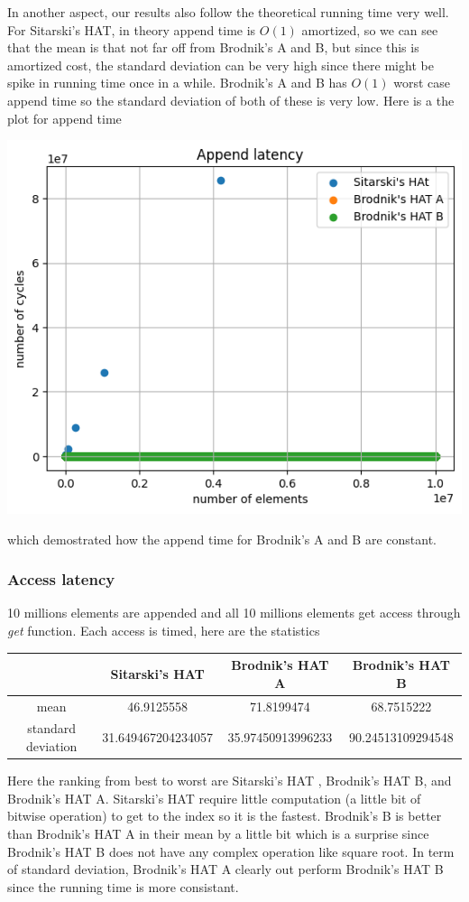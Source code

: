 \documentclass{article} %
\begin{document}
    In another aspect, our results also follow the theoretical running time very well. For Sitarski's HAT, in theory append time is $O(1)$ amortized, so we can see that the mean
    is that not far off from Brodnik's A and B, but since this is amortized cost, the standard deviation can be very high since there might be spike in running time once in a while. Brodnik's A and B has $O(1)$ worst case append time so
    the standard deviation of both of these is very low. Here is a the plot for append time
    \begin{center}
        \includegraphics{graphics/hat_append.png}
    \end{center}
    which demostrated how the append time for Brodnik's A and B are constant.
    \subsubsection*{Access latency}
    10 millions elements are appended and all 10 millions elements get access through \emph{get} function.
    Each access is timed, here are the statistics
    \begin{center}
        \begin{tabular}{|c|c|c|c|}\hline
            & Sitarski's HAT & Brodnik's HAT A & Brodnik's HAT B\\\hline
            mean &  46.9125558 & 71.8199474 & 68.7515222\\\hline
            standard deviation & 31.649467204234057  & 35.97450913996233 & 90.24513109294548\\\hline 
        \end{tabular}
    \end{center}
    Here the ranking from best to worst are Sitarski's HAT , Brodnik's HAT B, and Brodnik's HAT A. Sitarski's HAT require little
    computation (a little bit of bitwise operation) to get to the index so it is the fastest. Brodnik's B is better than Brodnik's HAT A in
    their mean by a little bit which is a surprise since Brodnik's HAT B does not have any complex operation like square root. In term of standard deviation,
    Brodnik's HAT A clearly out perform Brodnik's HAT B since the running time is more consistant.
\end{document}
